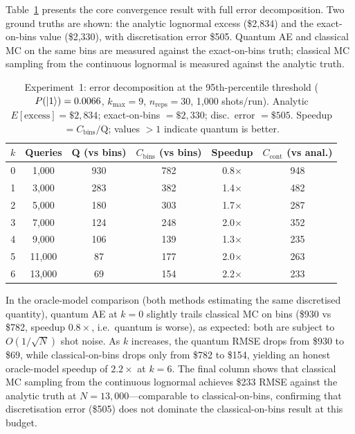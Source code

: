 \documentclass[11pt,a4paper]{article}
\begin{document}
Table~\ref{tab:exp1} presents the core convergence result with full error decomposition. Two ground truths are shown: the analytic lognormal excess (\$2,834) and the exact-on-bins value (\$2,330), with discretisation error \$505. Quantum AE and classical MC on the same bins are measured against the exact-on-bins truth; classical MC sampling from the continuous lognormal is measured against the analytic truth.

\begin{table}[t]
\centering
\caption{Experiment~1: error decomposition at the 95th-percentile threshold ($P(\ket{1}) = 0.0066$, $k_{\max} = 9$, $n_{\text{reps}} = 30$, 1,000 shots/run). Analytic $E[\text{excess}] = \$2{,}834$; exact-on-bins $= \$2{,}330$; disc.\ error $= \$505$. Speedup $= C_{\text{bins}}/\text{Q}$; values ${>}1$ indicate quantum is better.}
\label{tab:exp1}
\begin{tabular}{cccccc}
\toprule
$k$ & Queries & Q (vs bins) & $C_{\text{bins}}$ (vs bins) & Speedup & $C_{\text{cont}}$ (vs anal.) \\
\midrule
0 & 1,000 & 930 & 782 & 0.8$\times$ & 948 \\
1 & 3,000 & 283 & 382 & 1.4$\times$ & 482 \\
2 & 5,000 & 180 & 303 & 1.7$\times$ & 287 \\
3 & 7,000 & 124 & 248 & 2.0$\times$ & 352 \\
4 & 9,000 & 106 & 139 & 1.3$\times$ & 235 \\
5 & 11,000 & 87 & 177 & 2.0$\times$ & 263 \\
6 & 13,000 & 69 & 154 & 2.2$\times$ & 233 \\
\bottomrule
\end{tabular}
\end{table}

In the oracle-model comparison (both methods estimating the same discretised quantity), quantum AE at $k=0$ slightly trails classical MC on bins (\$930 vs \$782, speedup $0.8\times$, i.e.\ quantum is worse), as expected: both are subject to $O(1/\sqrt{N})$ shot noise. As $k$ increases, the quantum RMSE drops from \$930 to \$69, while classical-on-bins drops only from \$782 to \$154, yielding an honest oracle-model speedup of $2.2\times$ at $k=6$. The final column shows that classical MC sampling from the continuous lognormal achieves \$233 RMSE against the analytic truth at $N = 13{,}000$---comparable to classical-on-bins, confirming that discretisation error (\$505) does not dominate the classical-on-bins result at this budget.
\end{document}
